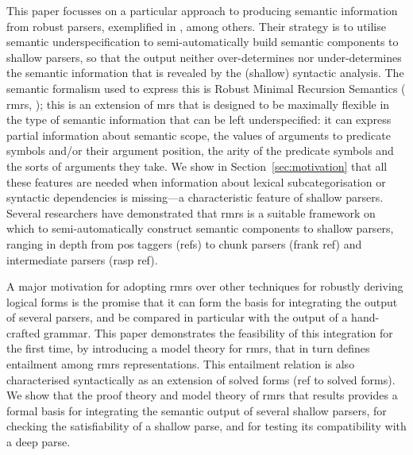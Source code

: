 This paper focusses on a particular approach to producing semantic
information from robust parsers, exemplified in
\cite{copestake:2003,frank:2004}, among others.  Their strategy is to
utilise semantic underspecification to semi-automatically build
semantic components to shallow parsers, so that the output neither
over-determines nor under-determines the semantic information that is
revealed by the (shallow) syntactic analysis.  The semantic formalism
used to express this is Robust Minimal Recursion Semantics ({\sc
  rmrs}, \cite{copestake:2003}); this is an extension of {\sc mrs}
\cite{copestake:etal:2005} that is designed to be maximally flexible
in the type of semantic information that can be left underspecified:
it can express partial information about semantic scope, the values of
arguments to predicate symbols and/or their argument position, the
arity of the predicate symbols and the sorts of arguments they take.
We show in Section~\ref{sec:motivation} that all these features are
needed when information about lexical subcategorisation or
syntactic dependencies is missing---a characteristic feature of
shallow parsers.  Several researchers have demonstrated that {\sc
  rmrs} is a suitable framework on which to semi-automatically
construct semantic components to shallow parsers, ranging in depth
from {\sc pos} taggers (refs) to chunk parsers (frank ref) and
intermediate parsers ({\sc rasp} ref).

A major motivation for adopting {\sc rmrs} over other techniques for
robustly deriving logical forms is the promise that it can form the
basis for integrating the output of several parsers, and be compared
in particular with the output of a hand-crafted grammar.  This paper
demonstrates the feasibility of this integration for the first time,
by introducing a model theory for {\sc rmrs}, that in turn defines
entailment among {\sc rmrs} representations.  This entailment relation
is also characterised syntactically as an extension of solved forms
(ref to solved forms).  We show that the proof theory and model theory
of {\sc rmrs} that results provides a formal basis for integrating the
semantic output of several shallow parsers, for checking the
satisfiability of a shallow parse, and for testing its compatibility
with a deep parse.

